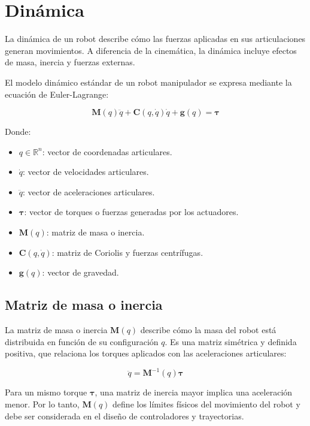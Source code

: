 \section{Dinámica} \label{sec:dinamica}

La dinámica de un robot describe cómo las fuerzas aplicadas en sus articulaciones generan movimientos. A diferencia de la cinemática, la dinámica incluye efectos de masa, inercia y fuerzas externas.

El modelo dinámico estándar de un robot manipulador se expresa mediante la ecuación de Euler-Lagrange:

\begin{equation}
	\mathbf{M}(q)\ddot{q} + \mathbf{C}(q,\dot{q})\dot{q} + \mathbf{g}(q) = \boldsymbol{\tau}
\end{equation}

Donde:
\begin{itemize}
	\item \( q \in \mathbb{R}^n \): vector de coordenadas articulares.
	\item \( \dot{q} \): vector de velocidades articulares.
	\item \( \ddot{q} \): vector de aceleraciones articulares.
	\item \( \boldsymbol{\tau} \): vector de torques o fuerzas generadas por los actuadores.
	\item \( \mathbf{M}(q) \): matriz de masa o inercia.
	\item \( \mathbf{C}(q, \dot{q}) \): matriz de Coriolis y fuerzas centrífugas.
	\item \( \mathbf{g}(q) \): vector de gravedad.
\end{itemize}
 

\subsection{Matriz de masa o inercia}


La matriz de masa o inercia \( \mathbf{M}(q) \) describe cómo la masa del robot está distribuida en función de su configuración \( q \). Es una matriz simétrica y definida positiva, que relaciona los torques aplicados con las aceleraciones articulares:

\[
\ddot{q} = \mathbf{M}^{-1}(q) \boldsymbol{\tau}
\]

Para un mismo torque \( \boldsymbol{\tau} \), una matriz de inercia mayor implica una aceleración menor. Por lo tanto, \( \mathbf{M}(q) \) define los límites físicos del movimiento del robot y debe ser considerada en el diseño de controladores y trayectorias.


